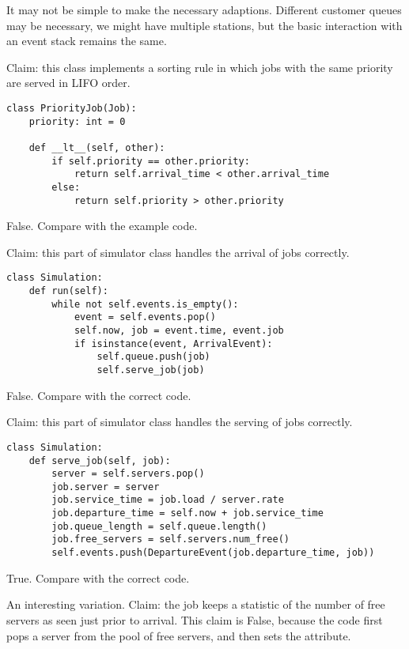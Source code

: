 \documentclass[stochastic-or.tex]{subfiles}
\begin{document}
It may not be simple to make the necessary adaptions.
Different customer queues may be necessary, we might have multiple stations, but the basic interaction with an event stack remains the same.


\begin{truefalse}
Claim: this class implements a sorting rule in which jobs with the same priority are served in LIFO order.
\begin{verbatim}
class PriorityJob(Job):
    priority: int = 0

    def __lt__(self, other):
        if self.priority == other.priority:
            return self.arrival_time < other.arrival_time
        else:
            return self.priority > other.priority
\end{verbatim}
\begin{solution}
False. Compare with the example code.
\end{solution}
\end{truefalse}

\begin{truefalse}
Claim: this part of simulator class handles the arrival of jobs correctly.
\begin{verbatim}
class Simulation:
    def run(self):
        while not self.events.is_empty():
            event = self.events.pop()
            self.now, job = event.time, event.job
            if isinstance(event, ArrivalEvent):
                self.queue.push(job)
                self.serve_job(job)
\end{verbatim}
\begin{solution}
False. Compare with the correct code.
\end{solution}
\end{truefalse}

\begin{truefalse}
Claim: this part of simulator class handles the serving of jobs correctly.
\begin{verbatim}
class Simulation:
    def serve_job(self, job):
        server = self.servers.pop()
        job.server = server
        job.service_time = job.load / server.rate
        job.departure_time = self.now + job.service_time
        job.queue_length = self.queue.length()
        job.free_servers = self.servers.num_free()
        self.events.push(DepartureEvent(job.departure_time, job))
\end{verbatim}
\begin{solution}
True. Compare with the correct code.

An interesting variation. Claim: the job keeps a statistic of the number of free servers as seen just prior to arrival. This claim is False, because the code first pops a server from the pool of free servers, and then sets the  attribute.
\end{solution}
\end{truefalse}
\end{document}
